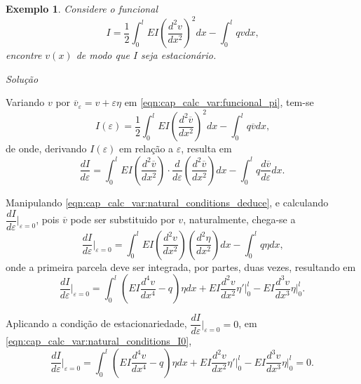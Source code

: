 \documentclass[
	12pt,				%
	openright,			%
    twoside,			%
	a4paper,			%
	english,			%
	french,				%
	spanish,			%
	brazil				%
	]{abntex2}
\makeatletter
\newtheorem{exemplo}{Exemplo}
\renewenvironment{proof}[1][\proofname]{
	\par\pushQED{\qed}%
	\normalfont \topsep6\p@\@plus6\p@\relax
	\trivlist
	\item\relax
		{\itshape
			#1\@addpunct{.}}\hspace\labelsep\ignorespaces
}{%
	\popQED\endtrivlist\@endpefalse
}
\newenvironment{solution}{
	\begin{proof}[Solução]
}{%
	\end{proof}
}
\numberwithin{lema}{chapter}
\numberwithin{teorema}{chapter}
\numberwithin{definicao}{chapter}
\numberwithin{exemplo}{chapter}
\numberwithin{figure}{chapter}
\makeatother
\begin{document}
\begin{exemplo}
	\label{ex:cond_contorno}
	Considere o funcional
	\begin{equation}
		\label{eqn:cap_calc_var:funcional_pi}
		I = \frac{1}{2}	\int_{0}^{l}
			EI \left (
				\frac{d^2v}{dx^2}
			\right )^2 dx
			-
			\int_{0}^{l} qv dx
			\text{,}
	\end{equation}
	encontre $v(x)$ de modo que $I$ seja estacionário.
\end{exemplo}
\begin{solution}
	Variando $v$ por $\overline{v}_{\varepsilon}=v+\varepsilon \eta$ em \eqref{eqn:cap_calc_var:funcional_pi}, tem-se
	$$
		I(\varepsilon) = \frac{1}{2} \int_{0}^{l}
			EI \left (
				\frac{d^2\overline{v}}{dx^2}
			\right )^2 dx
			-
			\int_{0}^{l} q\overline{v} dx
			\text{,}
	$$
	de onde, derivando $I(\varepsilon)$ em relação a $\varepsilon$, resulta em
	\begin{equation}
		\label{eqn:cap_calc_var:natural_conditions_deduce}
		\frac{dI}{d\varepsilon} = 
			\int_{0}^{l} EI \left (
				\frac{d^2\overline{v}}{dx^2}
			\right ) \cdot 
			\frac{d}{d\varepsilon}\left (
				\frac{d^2\overline{v}}{dx^2}
			\right ) dx
			-
			\int_{0}^{l} q\frac{d\overline{v}}{d\varepsilon} dx
			\text{.}
	\end{equation}
	
	Manipulando \eqref{eqn:cap_calc_var:natural_conditions_deduce}, e calculando $\dfrac{dI}{d\varepsilon}\Big |_{\varepsilon=0}$, pois $\overline{v}$ pode ser substituido por $v$, naturalmente, chega-se a
	$$
		\frac{dI}{d\varepsilon}\Big |_{\varepsilon=0} = 
			\int_{0}^{l} EI \left (
				\frac{d^2v}{dx^2}
			\right ) \left (
				\frac{d^2\eta}{dx^2}
			\right ) dx
			-
			\int_{0}^{l}q\eta dx
		\text{,}
	$$
	onde a primeira parcela deve ser integrada, por partes, duas vezes, resultando em
	\begin{equation}
		\label{eqn:cap_calc_var:natural_conditions_I0}
		\frac{dI}{d\varepsilon}\Big |_{\varepsilon=0} = 
			\int_{0}^{l} \left (
				EI\frac{d^4 v}{dx^4}-q 
			\right ) \eta dx
			+
			EI\frac{d^2 v}{dx^2} \eta' \Big |_{0}^{l}
			-
			EI\frac{d^3 v}{dx^3} \eta \Big |_{0}^{l}
			\text{.}
	\end{equation}
	
	Aplicando a condição de estacionariedade, $\dfrac{dI}{d\varepsilon}\Big |_{\varepsilon=0}=0$, em \eqref{eqn:cap_calc_var:natural_conditions_I0},
	\begin{equation}
		\label{eqn:cap_calc_var:natural_conditions_I0_eq_0}
		\frac{dI}{d\varepsilon}\Big |_{\varepsilon=0} = 
			\int_{0}^{l} \left (
				EI\frac{d^4 v}{dx^4}-q 
			\right ) \eta dx
			+
			EI\frac{d^2 v}{dx^2} \eta ' \Big |_{0}^{l}
			-
			EI\frac{d^3 v}{dx^3} \eta \Big |_{0}^{l}
			= 0
			\text{.}
	\end{equation}


\end{solution}
\end{document}
